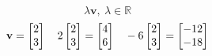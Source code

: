\documentclass[12 pt]{slides}
\begin{document}
\begingroup
\[\lambda\textbf{v},\ \lambda \in \mathbb{R}\]
\endgroup
\[\\ \textbf{v} = \begin{bmatrix}2\\3\end{bmatrix}\quad 2\begin{bmatrix}2\\3\end{bmatrix} = \begin{bmatrix}4\\6\end{bmatrix}\quad -6\begin{bmatrix}2\\3\end{bmatrix} = \begin{bmatrix}-12\\-18\end{bmatrix}\]
\end{document}
